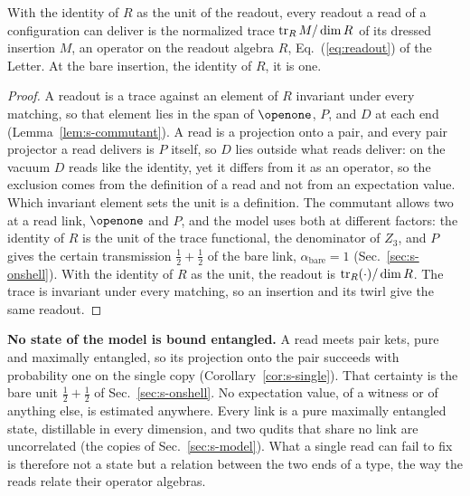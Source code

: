 \begin{theorem}
\label{thm:s-readout}
With the identity of $R$ as the unit of the readout, every readout a read of a configuration can deliver is the normalized trace $\operatorname{tr}_{R}M/\dim R$ of its dressed insertion $M$, an operator on the readout algebra $R$, Eq.~(\ref{eq:readout}) of the Letter. At the bare insertion, the identity of $R$, it is one.
\end{theorem}
\begin{proof}
A readout is a trace against an element of $R$ invariant under every matching, so that element lies in the span of $\openone$, $P$, and $D$ at each end (Lemma~\ref{lem:s-commutant}). A read is a projection onto a pair, and every pair projector a read delivers is $P$ itself, so $D$ lies outside what reads deliver: on the vacuum $D$ reads like the identity, yet it differs from it as an operator, so the exclusion comes from the definition of a read and not from an expectation value. Which invariant element sets the unit is a definition. The commutant allows two at a read link, $\openone$ and $P$, and the model uses both at different factors: the identity of $R$ is the unit of the trace functional, the denominator of $Z_{3}$, and $P$ gives the certain transmission $\tfrac{1}{2}+\tfrac{1}{2}$ of the bare link, $\alpha_{\mathrm{bare}}=1$ (Sec.~\ref{sec:s-onshell}). With the identity of $R$ as the unit, the readout is $\operatorname{tr}_{R}(\cdot)/\dim R$. The trace is invariant under every matching, so an insertion and its twirl give the same readout.
\end{proof}

\textbf{No state of the model is bound entangled.} A read meets pair kets, pure and maximally entangled, so its projection onto the pair succeeds with probability one on the single copy (Corollary~\ref{cor:s-single}). That certainty is the bare unit $\tfrac{1}{2}+\tfrac{1}{2}$ of Sec.~\ref{sec:s-onshell}. No expectation value, of a witness or of anything else, is estimated anywhere. Every link is a pure maximally entangled state, distillable in every dimension, and two qudits that share no link are uncorrelated (the copies of Sec.~\ref{sec:s-model}). What a single read can fail to fix is therefore not a state but a relation between the two ends of a type, the way the reads relate their operator algebras.

